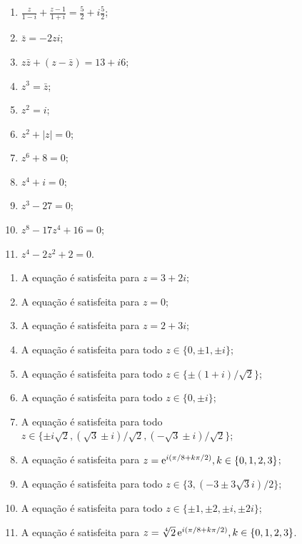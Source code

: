 \begin{questions}
{\begin{multicols}{3}
\begin{enumerate}[label=(\alph*)]
  \item $\displaystyle \frac{z}{1-i} + \frac{z-1}{1+i} = \frac{5}{2} + i \frac{5}{2}$;
  \item $\bar z = -2zi$;
  \item $z\bar z + (z - \bar z) = 13 + i6$;
  \item $z^3 = \bar z$;
  \item $z^2 = i$;
  \item $z^2 + |z| = 0$;
  \item $z^6 + 8 = 0$;
  \item $z^4 + i = 0$;
  \item $z^3 - 27 = 0$;
  \item $z^8 - 17z^4 + 16 = 0$;
  \item $z^4 - 2z^2 + 2 = 0$.
\end{enumerate}
\end{multicols}
}
\begin{solution}
\begin{enumerate}[label=(\alph*)]
  \item A equação é satisfeita para $z = 3 + 2i$;
  \item A equação é satisfeita para $z = 0$;
  \item A equação é satisfeita para $z = 2 + 3i$;
  \item A equação é satisfeita para todo $z\in\{0,\pm 1,\pm i\}$;
  \item A equação é satisfeita para todo $z\in\{\pm(1+i)/\sqrt{2}\}$;
  \item A equação é satisfeita para todo $z\in\{0,\pm i\}$;
  \item A equação é satisfeita para todo $z \in \{ \pm i \sqrt{2}, (\sqrt{3}\pm i)/\sqrt{2}, (-\sqrt{3}\pm i)/\sqrt{2} \} $;
  \item A equação é satisfeita para $z = \mathrm{e}^{i(\pi/8+k\pi/2)}, k\in\{0,1,2,3\}$;
  \item A equação é satisfeita para todo $z\in\{ 3, (-3 \pm 3\sqrt{3} i)/2 \}$;
  \item A equação é satisfeita para todo $z\in\{ \pm 1, \pm 2, \pm i, \pm 2i \}$;
  \item A equação é satisfeita para $z = \sqrt[4]{2}\, \mathrm{e}^{i(\pi/8 + k\pi/2)}, k\in\{0,1,2,3\}$.
\end{enumerate}
\end{solution}

\end{questions}
